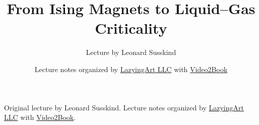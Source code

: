 \documentclass[11pt,oneside]{book}
\begin{document}
\hypersetup{pageanchor=false}
\frontmatter
\title{From Ising Magnets to Liquid--Gas Criticality}
\author{Lecture by Leonard Susskind}
\date{Lecture notes organized by \href{https://lazying.art}{LazyingArt LLC} with \href{https://github.com/lachlanchen/Video2Book}{Video2Book}}
\maketitle
\begin{center}
\small Original lecture by Leonard Susskind. Lecture notes organized by \href{https://lazying.art}{LazyingArt LLC} with \href{https://github.com/lachlanchen/Video2Book}{Video2Book}.
\end{center}
\clearpage
\hypersetup{pageanchor=true}
\mainmatter

\end{document}

